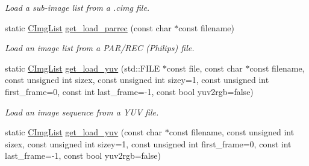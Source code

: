 \begin{DoxyCompactItemize}
\begin{DoxyCompactList}\small\item\em Load a sub-\/image list from a .cimg file. \end{DoxyCompactList}\item 
\hypertarget{structcimg__library_1_1_c_img_list_a35ef628a9224432225587787212a7c82}{static \hyperlink{structcimg__library_1_1_c_img_list}{C\-Img\-List} \hyperlink{structcimg__library_1_1_c_img_list_a35ef628a9224432225587787212a7c82}{get\-\_\-load\-\_\-parrec} (const char $\ast$const filename)}\label{structcimg__library_1_1_c_img_list_a35ef628a9224432225587787212a7c82}

\begin{DoxyCompactList}\small\item\em Load an image list from a P\-A\-R/\-R\-E\-C (Philips) file. \end{DoxyCompactList}\item 
\hypertarget{structcimg__library_1_1_c_img_list_aaa8f85db981559732ebec48625f39724}{static \hyperlink{structcimg__library_1_1_c_img_list}{C\-Img\-List} \hyperlink{structcimg__library_1_1_c_img_list_aaa8f85db981559732ebec48625f39724}{get\-\_\-load\-\_\-yuv} (std\-::\-F\-I\-L\-E $\ast$const file, const char $\ast$const filename, const unsigned int sizex, const unsigned int sizey=1, const unsigned int first\-\_\-frame=0, const int last\-\_\-frame=-\/1, const bool yuv2rgb=false)}\label{structcimg__library_1_1_c_img_list_aaa8f85db981559732ebec48625f39724}

\begin{DoxyCompactList}\small\item\em Load an image sequence from a Y\-U\-V file. \end{DoxyCompactList}\item 
\hypertarget{structcimg__library_1_1_c_img_list_a818c284882bee7993cb003e0b5739686}{static \hyperlink{structcimg__library_1_1_c_img_list}{C\-Img\-List} \hyperlink{structcimg__library_1_1_c_img_list_a818c284882bee7993cb003e0b5739686}{get\-\_\-load\-\_\-yuv} (const char $\ast$const filename, const unsigned int sizex, const unsigned int sizey=1, const unsigned int first\-\_\-frame=0, const int last\-\_\-frame=-\/1, const bool yuv2rgb=false)}\label{structcimg__library_1_1_c_img_list_a818c284882bee7993cb003e0b5739686}


\end{DoxyCompactItemize}

